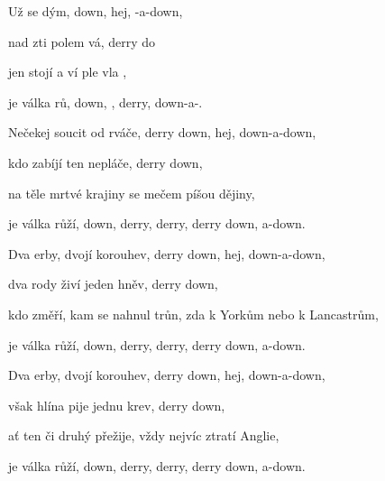 
\zs
Už  se  dým,  down, hej, -a-down, 

nad zti polem vá, derry do  

jen  stojí  a ví ple vla , 

je válka rů, down, , derry,  down-a-. 
\ks

\zs
Nečekej soucit od rváče, derry down, hej, down-a-down, 

kdo zabíjí ten nepláče, derry down, 

na těle mrtvé krajiny se mečem píšou dějiny, 

je válka růží, down, derry, derry, derry down, a-down. 
\ks

\zs
Dva erby, dvojí korouhev, derry down, hej, down-a-down, 

dva rody živí jeden hněv, derry down, 

kdo změří, kam se nahnul trůn, zda k Yorkům nebo k Lancastrům, 

je válka růží, down, derry, derry, derry down, a-down. 
\ks

\zs
Dva erby, dvojí korouhev, derry down, hej, down-a-down, 

však hlína pije jednu krev, derry down, 

ať ten či druhý přežije, vždy nejvíc ztratí Anglie, 

je válka růží, down, derry, derry, derry down, a-down.
\ks
\kp

